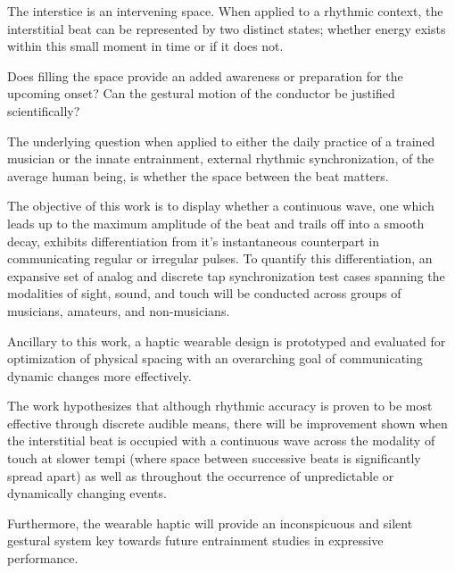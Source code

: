 
\setlength{\parskip}{1em}
\setlength{\parindent}{0em}

\noindent
The interstice is an intervening space. When applied to a rhythmic context, the interstitial beat can be represented by two distinct states; whether energy exists within this small moment in time or if it does not. 

Does filling the space provide an added awareness or preparation for the upcoming onset? Can the gestural motion of the conductor be justified scientifically?

The underlying question when applied to either the daily practice of a trained musician or the innate entrainment, external rhythmic synchronization, of the average human being, is whether the space between the beat matters.

The objective of this work is to display whether a continuous wave, one which leads up to the maximum amplitude of the beat and trails off into a smooth decay, exhibits differentiation from it's instantaneous counterpart in communicating regular or irregular pulses. To quantify this differentiation, an expansive set of analog and discrete tap synchronization test cases spanning the modalities of sight, sound, and touch will be conducted across groups of musicians, amateurs, and non-musicians.

Ancillary to this work, a haptic wearable design is prototyped and evaluated for optimization of physical spacing with an overarching goal of communicating dynamic changes more effectively.

The work hypothesizes that although rhythmic accuracy is proven to be most effective through discrete audible means, there will be improvement shown when the interstitial beat is occupied with a continuous wave across the modality of touch at slower tempi (where space between successive beats is significantly spread apart) as well as throughout the occurrence of unpredictable or dynamically changing events. 

Furthermore, the wearable haptic will provide an inconspicuous and silent gestural system key towards future entrainment studies in expressive performance.
